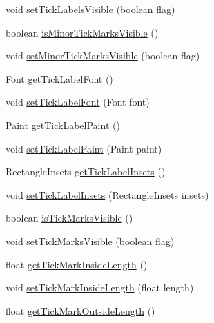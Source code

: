 \begin{DoxyCompactItemize}
\item 
void \mbox{\hyperlink{classorg_1_1jfree_1_1chart_1_1axis_1_1_axis_abcdadb52fe3b84309f229467ef6d6f82}{set\+Tick\+Labels\+Visible}} (boolean flag)
\item 
boolean \mbox{\hyperlink{classorg_1_1jfree_1_1chart_1_1axis_1_1_axis_ab0512be8dc8bf6d4093d9d7415a57dab}{is\+Minor\+Tick\+Marks\+Visible}} ()
\item 
void \mbox{\hyperlink{classorg_1_1jfree_1_1chart_1_1axis_1_1_axis_a00f878920447c433934aa54030843def}{set\+Minor\+Tick\+Marks\+Visible}} (boolean flag)
\item 
Font \mbox{\hyperlink{classorg_1_1jfree_1_1chart_1_1axis_1_1_axis_afa78f4c22da7b2d268e127767789ed4d}{get\+Tick\+Label\+Font}} ()
\item 
void \mbox{\hyperlink{classorg_1_1jfree_1_1chart_1_1axis_1_1_axis_a2a73b99f22d1d3d2a2b9f6e0feb4fcad}{set\+Tick\+Label\+Font}} (Font font)
\item 
Paint \mbox{\hyperlink{classorg_1_1jfree_1_1chart_1_1axis_1_1_axis_a76c5c5924b56a2936b516e7fe3ab50ee}{get\+Tick\+Label\+Paint}} ()
\item 
void \mbox{\hyperlink{classorg_1_1jfree_1_1chart_1_1axis_1_1_axis_a5ce2c0a548ab9ccc1946f4495120f78a}{set\+Tick\+Label\+Paint}} (Paint paint)
\item 
Rectangle\+Insets \mbox{\hyperlink{classorg_1_1jfree_1_1chart_1_1axis_1_1_axis_a1916ea69816af319a66834961b52b6f6}{get\+Tick\+Label\+Insets}} ()
\item 
void \mbox{\hyperlink{classorg_1_1jfree_1_1chart_1_1axis_1_1_axis_a087c1ec4d196a396c15fcaec85dfeb5b}{set\+Tick\+Label\+Insets}} (Rectangle\+Insets insets)
\item 
boolean \mbox{\hyperlink{classorg_1_1jfree_1_1chart_1_1axis_1_1_axis_ad1eb8269abe3384082e89700eaea08d0}{is\+Tick\+Marks\+Visible}} ()
\item 
void \mbox{\hyperlink{classorg_1_1jfree_1_1chart_1_1axis_1_1_axis_ae042728f9c85c4614720a84df73b50bb}{set\+Tick\+Marks\+Visible}} (boolean flag)
\item 
float \mbox{\hyperlink{classorg_1_1jfree_1_1chart_1_1axis_1_1_axis_a6148f15b99e9ba54ac3a3793e16e3110}{get\+Tick\+Mark\+Inside\+Length}} ()
\item 
void \mbox{\hyperlink{classorg_1_1jfree_1_1chart_1_1axis_1_1_axis_a2668a7d63e7a82ca62f94dc27fbc3a80}{set\+Tick\+Mark\+Inside\+Length}} (float length)
\item 
float \mbox{\hyperlink{classorg_1_1jfree_1_1chart_1_1axis_1_1_axis_aa25be81d8bfbbdd2c6e123948f953ec8}{get\+Tick\+Mark\+Outside\+Length}} ()

\end{DoxyCompactItemize}
